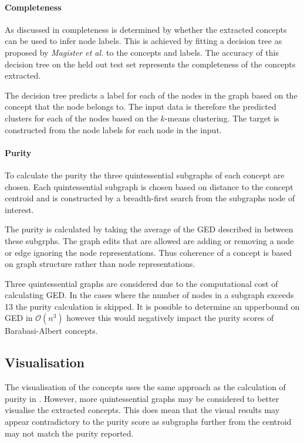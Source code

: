 \paragraph{Completeness}
As discussed in  completeness is determined by whether the extracted concepts can be used to infer node labels.
This is achieved by fitting a decision tree\cite{kazhdan2020now} as proposed by \textit{Magister et al.}\cite{magister2021gcexplainer} to the concepts and labels.
The accuracy of this decision tree on the held out test set represents the completeness of the concepts extracted.

The decision tree predicts a label for each of the nodes in the graph based on the concept that the node belongs to.
The input data is therefore the predicted clusters for each of the nodes based on the $k$-means clustering.
The target is constructed from the node labels for each node in the input.

\paragraph{Purity}
To calculate the purity the three quintessential subgraphs of each concept are chosen.
Each quintessential subgraph is chosen based on distance to the concept centroid and is constructed by a breadth-first search from the subgraphs node of interest.

The purity is calculated by taking the average of the GED described in  between these subgrphs.
The graph edits that are allowed are adding or removing a node or edge ignoring the node representations.
Thus coherence of a concept is based on graph structure rather than node representations.

Three quintessential graphs are considered due to the computational cost of calculating GED.
In the cases where the number of nodes in a subgraph exceeds 13 the purity calculation is skipped.
It is possible to determine an upperbound on GED in $\mathcal{O}(n^3)$ however this would negatively impact the purity scores of Barabasi-Albert concepts.

\subsection{Visualisation}
\label{sec:vis}
The visualisation of the concepts uses the same approach as the calculation of purity in .
However, more quintessential graphs may be considered to better visualise the extracted concepts.
This does mean that the visual results may appear contradictory to the purity score as subgraphs further from the centroid may not match the purity reported.

